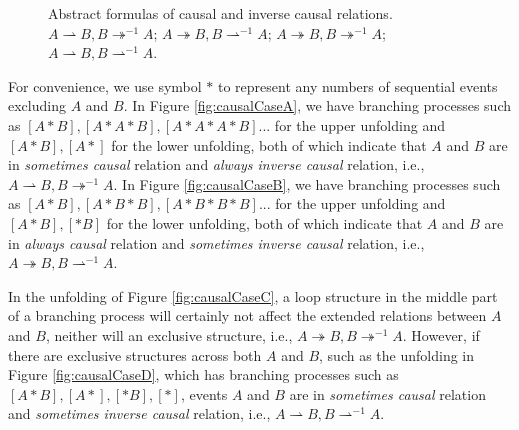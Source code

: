 \documentclass{llncs}
\begin{document}
\begin{figure}[ht]
{\begin{minipage}[b]{0.45\textwidth}
	\end{minipage}
	\label{fig:causalCaseC}
}
\caption{Abstract formulas of causal and inverse causal relations.  $A\rightharpoonup B, B\twoheadrightarrow^{-1}A$;  $A\twoheadrightarrow B, B\rightharpoonup^{-1}A$;  $A\twoheadrightarrow B, B\twoheadrightarrow^{-1}A$;  $A\rightharpoonup B, B\rightharpoonup^{-1}A$.\label{fig:causalCases}}
\end{figure}

For convenience, we use symbol $*$ to represent any numbers of sequential events excluding $A$ and $B$. In Figure \ref{fig:causalCaseA}, we have branching processes such as $[A*B],[A*A*B],[A*A*A*B]...$ for the upper unfolding and $[A*B],[A*]$ for the lower unfolding, both of which indicate that $A$ and $B$ are in \textit{sometimes causal} relation and \textit{always inverse causal} relation, i.e., $A\rightharpoonup B,B\twoheadrightarrow^{-1}A$. In Figure \ref{fig:causalCaseB}, we have branching processes such as $[A*B],[A*B*B],[A*B*B*B]...$ for the upper unfolding and $[A*B],[*B]$ for the lower unfolding, both of which indicate that $A$ and $B$ are in \textit{always causal} relation and \textit{sometimes inverse causal} relation, i.e., $A\twoheadrightarrow B,B\rightharpoonup^{-1}A$.

In the unfolding of Figure \ref{fig:causalCaseC}, a loop structure in the middle part of a branching process will certainly not affect the extended relations between $A$ and $B$, neither will an exclusive structure, i.e., $A\twoheadrightarrow B,B\twoheadrightarrow^{-1}A$. However, if there are exclusive structures across both $A$ and $B$, such as the unfolding in Figure \ref{fig:causalCaseD}, which has branching processes such as $[A*B],[A*],[*B],[*]$, events $A$ and $B$ are in \textit{sometimes causal} relation and \textit{sometimes inverse causal} relation, i.e., $A\rightharpoonup B,B\rightharpoonup^{-1}A$.
\end{document}
